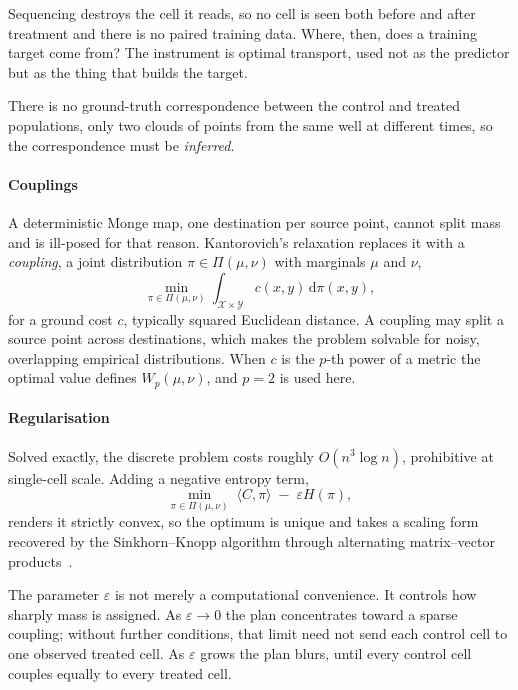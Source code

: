 \begin{question}
Sequencing destroys the cell it reads, so no cell is seen both before and after
treatment and there is no paired training data. Where, then, does a training
target come from? The instrument is optimal transport, used not as the predictor
but as the thing that builds the target.
\end{question}

\noindent
There is no ground-truth correspondence between the control and treated
populations, only two clouds of points from the same well at different times, so
the correspondence must be \emph{inferred}.

\paragraph{Couplings} A deterministic Monge map, one destination per source
point, cannot split mass and is ill-posed for that reason. Kantorovich's
relaxation replaces it with a \emph{coupling}, a joint distribution
$\pi \in \Pi(\mu,\nu)$ with marginals $\mu$ and $\nu$,
\begin{equation}
  \min_{\pi \in \Pi(\mu,\nu)} \int_{\mathcal{X}\times\mathcal{Y}}
  c(x,y)\,\mathrm{d}\pi(x,y),
\end{equation}
for a ground cost $c$, typically squared Euclidean distance. A coupling may split
a source point across destinations, which makes the problem solvable for noisy,
overlapping empirical distributions. When $c$ is the $p$-th power of a metric the
optimal value defines $W_p(\mu,\nu)$, and $p=2$ is used here.

\paragraph{Regularisation}
Solved exactly, the discrete problem costs roughly $O(n^3 \log n)$, prohibitive
at single-cell scale. Adding a negative entropy term,
\begin{equation}
  \min_{\pi \in \Pi(\mu,\nu)} \; \langle C, \pi \rangle \;-\;
  \varepsilon H(\pi),
\end{equation}
renders it strictly convex, so the optimum is unique and takes a scaling form
recovered by the Sinkhorn--Knopp algorithm through alternating matrix--vector
products~\cite{cuturi}.

The parameter $\varepsilon$ is not merely a computational convenience. It
controls how sharply mass is assigned. As $\varepsilon \rightarrow 0$ the plan
concentrates toward a sparse coupling; without further conditions, that limit
need not send each control cell to one observed treated cell. As $\varepsilon$
grows the plan blurs, until every control cell couples equally to every treated
cell.

